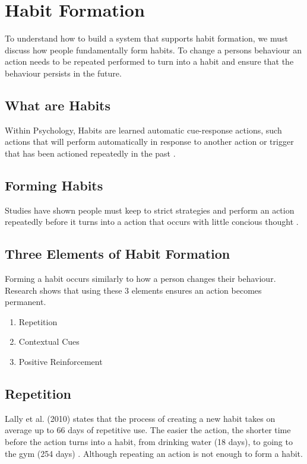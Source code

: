 \newpage

\section{Habit Formation}
To understand how to build a system that supports habit formation, we must discuss how people fundamentally form habits.\newline
\newline
To change a persons behaviour an action needs to be repeated performed to turn into a habit and ensure that the behaviour persists in the future.

\subsection{What are Habits}
Within Psychology, Habits are learned automatic cue-response actions, such actions that will perform automatically in response to another action or trigger that has been actioned repeatedly in the past \cite{article_the_habitual_consumer}.

\subsection{Forming Habits}
Studies have shown people must keep to strict strategies and perform an action repeatedly before it turns into a action that occurs with little concious thought \cite{article_promoting_habit_formation}.

\subsection{Three Elements of Habit Formation}
Forming a habit occurs similarly to how a person changes their behaviour. Research \cite{article_beyond_self_tracking_designing_apps} shows that using these 3 elements ensures an action becomes permanent.

\begin{enumerate}
  \item Repetition
  \item Contextual Cues
  \item Positive Reinforcement
\end{enumerate}

\subsection*{Repetition}
Lally et al. (2010) states that the process of creating a new habit takes on average up to 66 days of repetitive use. The easier the action, the shorter time before the action turns into a habit, from drinking water (18 days), to going to the gym (254 days) \cite{article_how_habits_formed_modelling_habit_formation}. Although repeating an action is not enough to form a habit.

